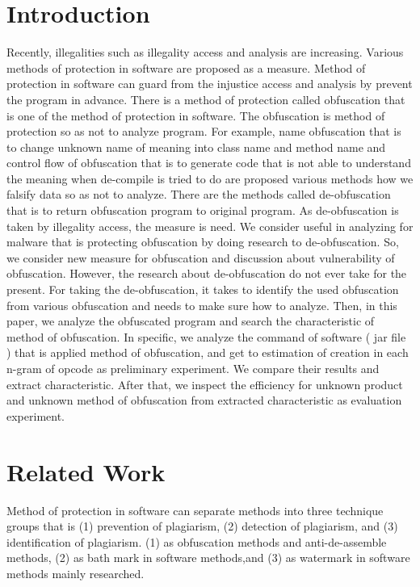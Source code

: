 \documentclass[conference]{IEEEtran}
\begin{document}
\section{Introduction}
Recently, illegalities such as illegality access and analysis are
increasing.  Various methods of protection in software are proposed as
a measure.  Method of protection in software can guard from the
injustice access and analysis by prevent the program in advance.
There is a method of protection called obfuscation that is one of the
method of protection in software.  The obfuscation is method of
protection so as not to analyze program.
%
For example, name obfuscation that is to change unknown name of
meaning into class name and method name and control flow of
obfuscation that is to generate code that is not able to understand
the meaning when de-compile is tried to do are proposed various
methods how we falsify data so as not to analyze.  There are the
methods called de-obfuscation that is to return obfuscation program to
original program.  As de-obfuscation is taken by illegality access,
the measure is need.  We consider useful in analyzing for malware that
is protecting obfuscation by doing research to de-obfuscation.  So, we
consider new measure for obfuscation and discussion about
vulnerability of obfuscation.  However, the research about
de-obfuscation do not ever take for the present.  For taking the
de-obfuscation, it takes to identify the used obfuscation from various
obfuscation and needs to make sure how to analyze.  Then, in this
paper, we analyze the obfuscated program and search the characteristic
of method of obfuscation.  In specific, we analyze the command of
software ( jar file ) that is applied method of obfuscation, and get
to estimation of creation in each n-gram of opcode as preliminary
experiment.  We compare their results and extract characteristic.
After that, we inspect the efficiency for unknown product and unknown
method of obfuscation from extracted characteristic as evaluation
experiment.

\section{Related Work}

Method of protection in software can separate methods into three
technique groups that is (1) prevention of plagiarism, (2) detection
of plagiarism, and (3) identification of
plagiarism.\cite{collberg09surreptitious} (1) as obfuscation methods
and anti-de-assemble methods\cite{tyma00patent,monden97ieice}, (2) as
bath mark in software methods\cite{tamada05ieice},and (3) as watermark
in software methods mainly researched\cite{collberg99popl}.
\end{document}
